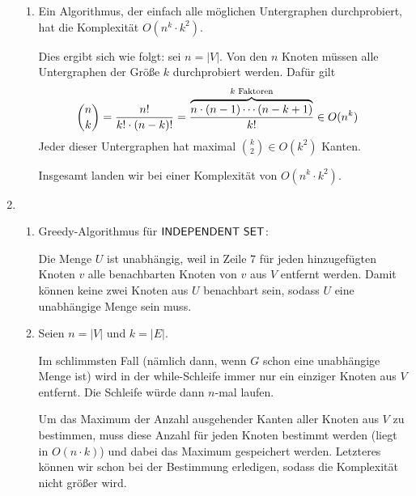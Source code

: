 \begin{enumerate}
\begin{enumerate}
      \item Ein Algorithmus, der einfach alle möglichen Untergraphen
        durchprobiert, hat die Komplexität $O(n^k \cdot k^2)$.

        Dies ergibt sich wie folgt: sei $n = |V|$. Von den $n$ Knoten müssen
        alle Untergraphen der Größe $k$ durchprobiert werden. Dafür gilt
        \begin{align*}
          \binom{n}{k} & = \frac{n!}{k! \cdot (n-k)!}
          = \frac{%
            \overbrace{n \cdot (n-1) \cdots (n-k+1)}^{k \text{\ Faktoren}}
            }{k!}
          \in O(n^k)
        \end{align*}
        Jeder dieser Untergraphen hat maximal $\binom{k}{2} \in O(k^2)$ Kanten.

        Insgesamt landen wir bei einer Komplexität von $O(n^k \cdot k^2)$.
      \end{enumerate}

    \item
      \begin{enumerate}
        \item Greedy-Algorithmus für $\textsf{INDEPENDENT SET}$:
          \begin{algorithmic}[1]
            \ENDWHILE%
          \end{algorithmic}
          Die Menge $U$ ist unabhängig, weil in Zeile 7 für jeden hinzugefügten
          Knoten $v$ alle benachbarten Knoten von $v$ aus $V$ entfernt werden.
          Damit können keine zwei Knoten aus $U$ benachbart sein, sodass $U$
          eine unabhängige Menge sein muss.

        \item Seien $n = |V|$ und $k = |E|$.

          Im schlimmsten Fall (nämlich dann, wenn $G$ schon eine unabhängige
          Menge ist) wird in der while-Schleife immer nur ein einziger Knoten
          aus $V$ entfernt. Die Schleife würde dann $n$-mal laufen.

          Um das Maximum der Anzahl ausgehender Kanten aller Knoten aus $V$ zu
          bestimmen, muss diese Anzahl für jeden Knoten bestimmt werden (liegt in
          $O(n \cdot k)$) und dabei das Maximum gespeichert werden. Letzteres
          können wir schon bei der Bestimmung erledigen, sodass die Komplexität
          nicht größer wird.


\end{enumerate}
\end{enumerate}
